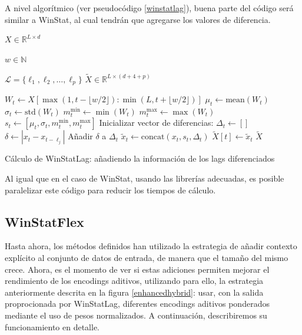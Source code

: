 A nivel algorítmico (ver pseudocódigo \ref{winstatlag}), buena parte del código será similar a WinStat, al cual tendrán que agregarse los valores de diferencia.

\begin{algorithm}[H]
	\begin{algorithmic}[1]
		\Require 
		
		$X \in \mathbb{R}^{L \times d}$ 
		
		$w \in \mathbb{N}$ 
		
		$\mathcal{L} = \{\ell_1, \ell_2, \dots, \ell_p\}$ 
		\Ensure 
		$\tilde{X} \in \mathbb{R}^{L \times (d + 4 + p)}$
		
		\State $W_t \gets X[\max(1, t - \lfloor w/2 \rfloor) : \min(L, t + \lfloor w/2 \rfloor)]$
		\State $\mu_t \gets \text{mean}(W_t)$
		\State $\sigma_t \gets \text{std}(W_t)$
		\State $m^{\min}_t \gets \min(W_t)$
		\State $m^{\max}_t \gets \max(W_t)$
		\State $s_t \gets [\mu_t, \sigma_t, m^{\min}_t, m^{\max}_t]$
		\State Inicializar vector de diferencias: $\Delta_t \gets []$
		\State $\delta \gets |x_t - x_{t - \ell_j}|$
		\State Añadir $\delta$ a $\Delta_t$
		\EndIf
		\EndFor
		\State $\tilde{x}_t \gets \text{concat}(x_t, s_t, \Delta_t)$
		\State $\tilde{X}[t] \gets \tilde{x}_t$
		\EndFor
		\State \Return $\tilde{X}$
	\end{algorithmic}
	\caption{Cálculo de WinStatLag: añadiendo la información de los lags diferenciados}
	\label{winstatlag}
\end{algorithm}

Al igual que en el caso de WinStat, usando las librerías adecuadas, es posible paralelizar este código para reducir los tiempos de cálculo.

\subsection{WinStatFlex}

Hasta ahora, los métodos definidos han utilizado la estrategia de añadir contexto explícito al conjunto de datos de entrada, de manera que el tamaño del mismo crece. Ahora, es el momento de ver si estas adiciones permiten mejorar el rendimiento de los encodings aditivos, utilizando para ello, la estrategia anteriormente descrita en la figura \ref{enhancedhybrid}: usar, con la salida proprocionada por WinStatLag, diferentes encodings aditivos ponderados mediante el uso de pesos normalizados. A continuación, describiremos su funcionamiento en detalle.

